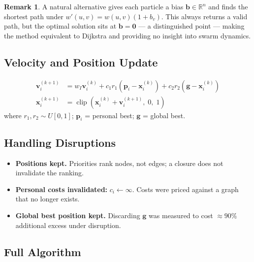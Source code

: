 \documentclass[11pt,a4paper]{article}
\theoremstyle{definition}
\newtheorem{remark}{Remark}[section]
\newcommand{\RR}{\mathbb{R}}
\newcommand{\xvec}{\mathbf{x}}
\newcommand{\vvec}{\mathbf{v}}
\newcommand{\pvec}{\mathbf{p}}
\newcommand{\gvec}{\mathbf{g}}
\begin{document}
\begin{remark}
  A natural alternative gives each particle a bias $\mathbf{b}\in\RR^n$ and finds the
  shortest path under $w'(u,v)=w(u,v)(1+b_v)$.  This always returns a valid path, but
  the optimal solution sits at $\mathbf{b}=\mathbf{0}$ --- a distinguished point --- making
  the method equivalent to Dijkstra and providing no insight into swarm dynamics.
\end{remark}

\subsection{Velocity and Position Update}

\begin{align}
  \vvec_i^{(k+1)} &= w_I\vvec_i^{(k)}
    + c_1 r_1(\pvec_i - \xvec_i^{(k)})
    + c_2 r_2(\gvec - \xvec_i^{(k)}) \label{eq:vel}\\
  \xvec_i^{(k+1)} &= \operatorname{clip}(\xvec_i^{(k)}+\vvec_i^{(k+1)},\;0,\;1)
  \label{eq:pos}
\end{align}
where $r_1,r_2\sim U[0,1]$; $\pvec_i$ = personal best; $\gvec$ = global best.

\subsection{Handling Disruptions}

\begin{itemize}
  \item \textbf{Positions kept.}  Priorities rank nodes, not edges; a closure does not
        invalidate the ranking.
  \item \textbf{Personal costs invalidated:} $c_i\leftarrow\infty$.  Costs were priced
        against a graph that no longer exists.
  \item \textbf{Global best position kept.}  Discarding $\gvec$ was measured to cost
        $\approx90\%$ additional excess under disruption.
\end{itemize}

\subsection{Full Algorithm}
\end{document}
